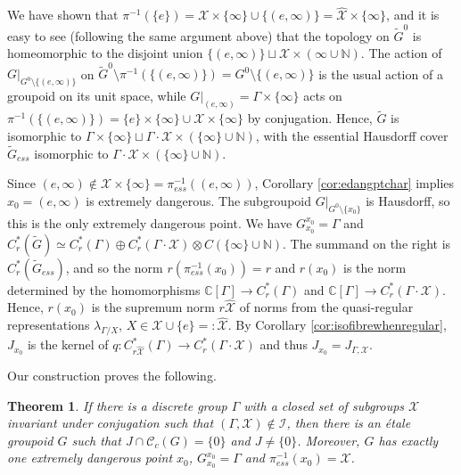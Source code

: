 \documentclass[a4paper, 12pt]{amsart}
\newtheorem{thm}{Theorem}[section]
\theoremstyle{definition}
\theoremstyle{remark}
\numberwithin{equation}{section}
\begin{document}
We have shown that $\pi^{-1}(\{e\}) = \mathcal{X}\times\{\infty\}\cup\{(e,\infty)\} = \hat{\mathcal{X}}\times\{\infty\}$, and it is easy to see (following the same argument above) that the topology on $\tilde{G}^{0}$ is homeomorphic to the disjoint union $\{(e,\infty)\}\sqcup\mathcal{X}\times (\infty\cup\mathbb{N})$. The action of $G|_{G^{0}\setminus \{(e,\infty)\}}$ on $\tilde{G}^{0}\setminus \pi^{-1}(\{(e,\infty)\}) = G^{0}\setminus \{(e,\infty)\}$ is the usual action of a groupoid on its unit space, while $G|_{(e,\infty)} = \Gamma\times\{\infty\}$ acts on $\pi^{-1}(\{(e,\infty)\}) = \{e\}\times\{\infty\}\cup \mathcal{X}\times \{\infty\}$ by conjugation. Hence, $\tilde{G}$ is isomorphic to $\Gamma\times \{\infty\}\sqcup \Gamma\cdot\mathcal{X}\times (\{\infty\}\cup\mathbb{N})$, with the essential Hausdorff cover $\tilde{G}_{ess}$ isomorphic to $\Gamma\cdot\mathcal{X}\times (\{\infty\}\cup\mathbb{N})$.

Since $(e,\infty)\notin \mathcal{X}\times\{\infty\} = \pi^{-1}_{ess}((e,\infty))$, Corollary \ref{cor:edangptchar} implies $x_{0} = (e,\infty)$ is extremely dangerous. The subgroupoid $G|_{G^{0}\setminus \{x_{0}\}}$ is Hausdorff, so this is the only extremely dangerous point. We have $G_{x_{0}}^{x_{0}} = \Gamma$ and $C^{*}_{r}(\tilde{G})\simeq C^{*}_{r}(\Gamma)\oplus C^{*}_{r}(\Gamma\cdot\mathcal{X})\otimes C(\{\infty\}\cup\mathbb{N})$. The summand on the right is $C^{*}_{r}(\tilde{G}_{ess})$, and so the norm $r(\pi^{-1}_{ess}(x_{0})) = r$ and $r(x_{0})$ is the norm determined by the homomorphisms $\mathbb{C}[\Gamma]\to C^{*}_{r}(\Gamma)$ and $\mathbb{C}[\Gamma]\to C^{*}_{r}(\Gamma\cdot\mathcal{X})$. Hence, $r(x_{0})$  is the supremum norm $r\hat{\mathcal{X}}$ of norms from the quasi-regular representations $\lambda_{\Gamma/X}$, $X\in\mathcal{X}\cup\{e\}=:\hat{\mathcal{X}}$. By Corollary \ref{cor:isofibrewhenregular}, $J_{x_{0}}$ is the kernel of $q:C^{*}_{r\hat{\mathcal{X}}}(\Gamma)\to C^{*}_{r}(\Gamma\cdot\mathcal{X})$ and thus $J_{x_{0}} = J_{\Gamma,\mathcal{X}}$.

Our construction proves the following.

\begin{thm}
\label{thm:nhdgpdconst}
If there is a discrete group $\Gamma$ with a closed set of subgroups $\mathcal{X}$ invariant under conjugation such that $(\Gamma, \mathcal{X})\notin \mathcal{I}$, then there is an \'etale groupoid $G$ such that $J\cap\mathscr{C}_{c}(G) = \{0\}$ and $J\neq \{0\}$. Moreover, $G$ has exactly one extremely dangerous point $x_{0}$, $G^{x_{0}}_{x_{0}} = \Gamma$ and $\pi_{ess}^{-1}(x_{0}) = \mathcal{X}$.
\end{thm}
\end{document}

